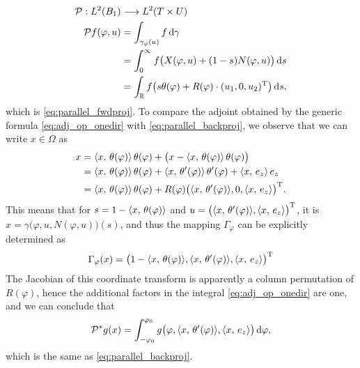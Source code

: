 \documentclass{amsart}
\renewcommand*{\phi}{\varphi}
\begin{document}
\begin{example}
 \begin{align*}
  \OPP: L^2(B_1) & \Lto L^2(T \times U) \\
  \OPP f(\phi, u) 
  &= \int_{\gamma_\phi(u)} f\, \D \gamma \\
  &= \int_0^\infty f\big(X(\phi, u) + (1-s) N(\phi, u)\big)\, \D s \\
  &= \int_\RR f\big(s \theta(\phi) + R(\phi) \cdot \TRANSP{(u_1, 0, u_2)}\big)\, \D s,
 \end{align*}
 which is \eqref{eq:parallel_fwdproj}. To compare the adjoint obtained by the generic formula \eqref{eq:adj_op_onedir} with 
 \eqref{eq:parallel_backproj}, we observe that we can write $x \in \Omega$ as
 \begin{align*}
  x 
  &= \INNER{x}{\theta(\phi)}\, \theta(\phi) + \big(x - \INNER{x}{\theta(\phi)}\, \theta(\phi)\big) \\
  &= \INNER{x}{\theta(\phi)}\, \theta(\phi) + \INNER{x}{\theta'(\phi)}\, \theta'(\phi) + \INNER{x}{e_z}\, e_z \\
  &= \INNER{x}{\theta(\phi)}\, \theta(\phi) + R(\phi) \TRANSP{\big(\INNER{x}{\theta'(\phi)}, 0, \INNER{x}{e_z}\big)}.
 \end{align*}
 This means that for $s = 1 - \INNER{x}{\theta(\phi)}$ and $u = \TRANSP{\big(\INNER{x}{\theta'(\phi)}, \INNER{x}{e_z}\big)}$, it is 
 $x = \gamma\big(\phi, u, N(\phi, u)\big)(s)$, and thus the mapping $\Gamma_\phi$ can be explicitly determined as
 \begin{equation*}
  \Gamma_\phi(x) = \TRANSP{\big(1 - \INNER{x}{\theta(\phi)}, \INNER{x}{\theta'(\phi)}, \INNER{x}{e_z}\big)}
 \end{equation*}
 The Jacobian of this coordinate transform is apparently a column permutation of $R(\phi)$, hence the additional factors in the integral 
 \eqref{eq:adj_op_onedir} are one, and we can conclude that
 \begin{equation*}
  \DUALOPP g(x) = \int_{-\phi_0}^{\phi_0} g\big(\phi, \INNER{x}{\theta'(\phi)}, \INNER{x}{e_z}\big)\, \D\phi,
 \end{equation*}
 which is the same as \eqref{eq:parallel_backproj}.
\end{example}
%
%
%
\end{document}
